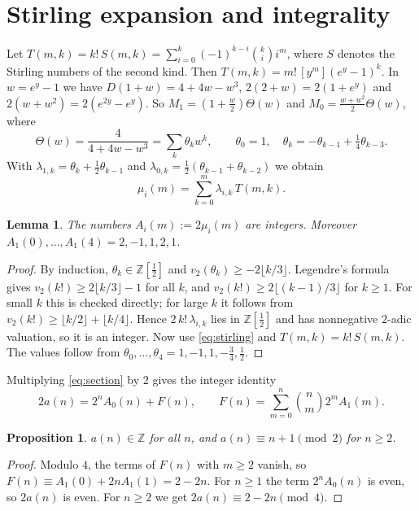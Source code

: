 \documentclass[11pt]{amsart}
\newtheorem{lemma}[theorem]{Lemma}
\newtheorem{proposition}[theorem]{Proposition}
\theoremstyle{remark}
\newcommand{\Z}{\mathbb{Z}}
\begin{document}
\section{Stirling expansion and integrality}

Let $T(m,k)=k!\,S(m,k)=\sum_{i=0}^k(-1)^{k-i}\binom ki i^m$, where $S$ denotes the Stirling numbers of the second kind.
Then $T(m,k)=m!\,[y^m](e^y-1)^k$.
In $w=e^y-1$ we have $D(1+w)=4+4w-w^3$, $2(2+w)=2(1+e^y)$ and $2(w+w^2)=2(e^{2y}-e^y)$.
So $M_1=(1+\tfrac w2)\Theta(w)$ and $M_0=\tfrac{w+w^2}{2}\Theta(w)$, where
\[
\Theta(w)=\frac{4}{4+4w-w^3}=\sum_k\theta_kw^k,\qquad \theta_0=1,\quad \theta_k=-\theta_{k-1}+\tfrac14\theta_{k-3}.
\]
With $\lambda_{1,k}=\theta_k+\tfrac12\theta_{k-1}$ and $\lambda_{0,k}=\tfrac12(\theta_{k-1}+\theta_{k-2})$ we obtain
\begin{equation}\label{eq:stirling}
\mu_i(m)=\sum_{k=0}^m\lambda_{i,k}\,T(m,k).
\end{equation}

\begin{lemma}\label{lem:halfint}
The numbers $A_i(m):=2\mu_i(m)$ are integers.
Moreover $A_1(0),\dots,A_1(4)=2,-1,1,2,1$.
\end{lemma}

\begin{proof}
By induction, $\theta_k\in\Z[\frac12]$ and $v_2(\theta_k)\ge-2\lfloor k/3\rfloor$.
Legendre's formula gives $v_2(k!)\ge2\lfloor k/3\rfloor-1$ for all $k$, and $v_2(k!)\ge2\lfloor (k-1)/3\rfloor$ for $k\ge1$.
For small $k$ this is checked directly; for large $k$ it follows from $v_2(k!)\ge\lfloor k/2\rfloor+\lfloor k/4\rfloor$.
Hence $2\,k!\,\lambda_{i,k}$ lies in $\Z[\frac12]$ and has nonnegative $2$-adic valuation, so it is an integer.
Now use \eqref{eq:stirling} and $T(m,k)=k!\,S(m,k)$.
The values follow from $\theta_0,\dots,\theta_4=1,-1,1,-\frac34,\frac12$.
\end{proof}

Multiplying \eqref{eq:section} by $2$ gives the integer identity
\begin{equation}\label{eq:int}
2a(n)=2^nA_0(n)+F(n),\qquad F(n)=\sum_{m=0}^n\binom nm2^mA_1(m).
\end{equation}

\begin{proposition}\label{prop:parity}
$a(n)\in\Z$ for all $n$, and $a(n)\equiv n+1\pmod 2$ for $n\ge2$.
\end{proposition}

\begin{proof}
Modulo $4$, the terms of $F(n)$ with $m\ge2$ vanish, so $F(n)\equiv A_1(0)+2nA_1(1)=2-2n$.
For $n\ge1$ the term $2^nA_0(n)$ is even, so $2a(n)$ is even.
For $n\ge2$ we get $2a(n)\equiv2-2n\pmod4$.
\end{proof}
\end{document}
